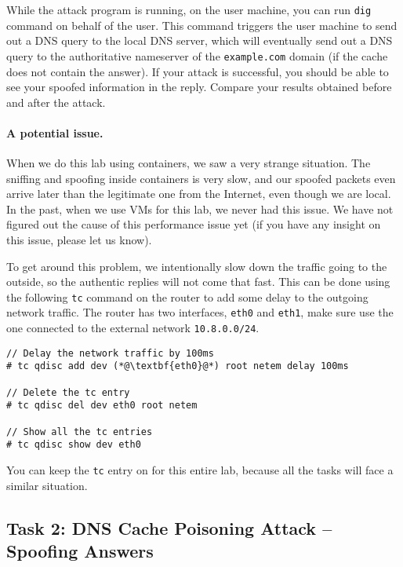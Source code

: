 While the attack program is running, on the user machine, you can
run \texttt{dig} command on behalf of the user.
This command triggers the user
machine to send out a DNS query to the local DNS server, which will
eventually send out a DNS query to the authoritative nameserver of the
\texttt{example.com} domain (if the cache does not contain the answer).
If your attack is successful, you should be able to see
your spoofed information in the reply. Compare your results obtained before
and after the attack. 


\paragraph{A potential issue.} When we do this lab using containers, 
we saw a very strange situation. The sniffing and spoofing 
inside containers is very slow, and our spoofed packets even arrive 
later than the legitimate one from the Internet, even though 
we are local. In the past, when we use VMs for this lab, we never 
had this issue. We have not figured out the cause of this 
performance issue yet (if you have any insight on this issue, please 
let us know).

To get around this problem, we intentionally slow down the 
traffic going to the outside, so the authentic replies will not 
come that fast. This can be done using the 
following \texttt{tc} command on the router to add some 
delay to the outgoing network traffic. 
The router has two interfaces, \texttt{eth0} and 
\texttt{eth1}, make sure use the one connected 
to the external network \texttt{10.8.0.0/24}.

\begin{lstlisting}
// Delay the network traffic by 100ms
# tc qdisc add dev (*@\textbf{eth0}@*) root netem delay 100ms

// Delete the tc entry
# tc qdisc del dev eth0 root netem

// Show all the tc entries 
# tc qdisc show dev eth0
\end{lstlisting}
 

You can keep the \texttt{tc} entry on for this entire lab, because 
all the tasks will face a similar situation. 


\subsection{Task 2: DNS Cache Poisoning Attack -- Spoofing Answers}

